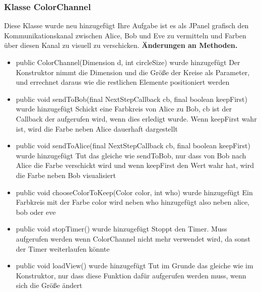 \documentclass{article}
\begin{document}
	\subsubsection{Klasse ColorChannel}
    Diese Klasse wurde neu hinzugefügt
    Ihre Aufgabe ist es als JPanel grafisch den
    Kommunikationskanal zwischen Alice, Bob und Eve
    zu vermitteln und Farben über diesen Kanal zu visuell
    zu verschicken.
    \textbf{Änderungen an Methoden.}\newline
	   \begin{itemize}
           \item public ColorChannel(Dimension d, int circleSize) wurde hinzugefügt\newline
               Der Konstruktor nimmt die Dimension und die Größe der Kreise als Parameter,
               und errechnet daraus wie die restlichen Elemente positioniert werden
           \item public void sendToBob(final NextStepCallback cb, final boolean keepFirst) wurde hinzugefügt\newline
               Schickt eine Farbkreis von Alice zu Bob, cb ist der Callback der aufgerufen wird, wenn dies
               erledigt wurde.
               Wenn keepFirst wahr ist, wird die Farbe neben Alice dauerhaft dargestellt
           \item public void sendToAlice(final NextStepCallback cb, final boolean keepFirst) wurde hinzugefügt\newline
               Tut das gleiche wie sendToBob, nur dass von Bob nach Alice die Farbe verschickt wird und
               wenn keepFirst den Wert wahr hat, wird die Farbe neben Bob visualisiert
           \item public void chooseColorToKeep(Color color, int who) wurde hinzugefügt\newline
               Ein Farbkreis mit der Farbe color wird neben who hinzugefügt also neben alice, bob oder eve
           \item public void stopTimer() wurde hinzugefügt\newline
               Stoppt den Timer. Muss aufgerufen werden wenn ColorChannel nicht mehr verwendet wird,
               da sonst der Timer weiterlaufen könnte
           \item public void loadView() wurde hinzugefügt\newline
               Tut im Grunde das gleiche wie im Konstruktor, nur dass diese Funktion dafür
               aufgerufen werden muss, wenn sich die Größe ändert

\end{itemize}
\end{document}
